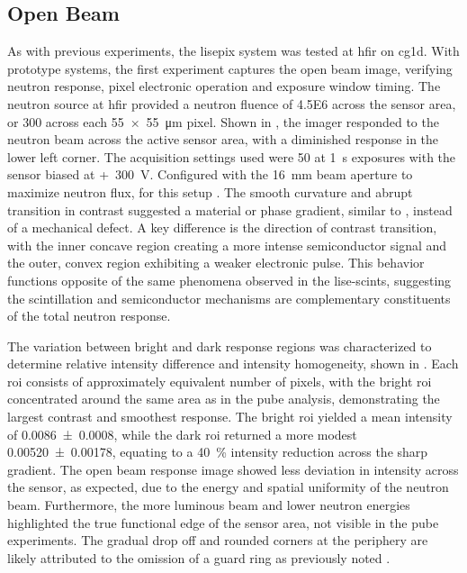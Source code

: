\documentclass[../../../main.tex]{subfiles}%
\begin{document}
%
    \subsection{Open Beam}%
    \label{sec:chapter-4:semiconductor-timepix:open-beam}%
    As with previous experiments, the \gls{lisepix} system was tested at \gls{hfir} on \gls{cg1d}. 
    With prototype systems, the first experiment captures the open beam image, verifying neutron response, pixel electronic operation and exposure window timing.    
    The neutron source at \gls{hfir} provided a neutron fluence of \SI{4.5E6}{\neutronfluence} across the sensor area, or \SI{300}{\neutronrate} across each \SI{55 x 55}{\micro\meter} pixel.    
    Shown in , the imager responded to the neutron beam across the active sensor area, with a diminished response in the lower left corner.
    The acquisition settings used were \SI{50}{\frames} at \SI{1}{\second} exposures with the sensor biased at \SI{300}[+]{\volt}.
    Configured with the \SI{16}{\milli\meter} beam aperture to maximize neutron flux,  for this setup \cite{Herrera_2018}.
    The smooth curvature and abrupt transition in contrast suggested a material or phase gradient, similar to , instead of a mechanical defect.
    A key difference is the direction of contrast transition, with the inner concave region creating a more intense semiconductor signal and the outer, convex region exhibiting a weaker electronic pulse.
    This behavior functions opposite of the same phenomena observed in the \glspl{lise-scint}, suggesting the scintillation and semiconductor mechanisms are complementary constituents of the total neutron response.
    \par%
    The variation between bright and dark response regions was characterized to determine relative intensity difference and intensity homogeneity, shown in .
    Each \gls{roi} consists of approximately equivalent number of pixels, with the bright \gls{roi} concentrated around the same area as in the \gls{pube} analysis, demonstrating the largest contrast and smoothest response.
    The bright \gls{roi} yielded a mean intensity of \num{0.0086(8)}, while the dark \gls{roi} returned a more modest \num{0.00520(178)}, equating to a \SI{40}{\percent} intensity reduction across the sharp gradient.
    The open beam response image showed less deviation in intensity across the sensor, as expected, due to the energy and spatial uniformity of the neutron beam.
    Furthermore, the more luminous beam and lower neutron energies highlighted the true functional edge of the sensor area, not visible in the \gls{pube} experiments.
    The gradual drop off and rounded corners at the periphery are likely attributed to the omission of a guard ring as previously noted \cite{Herrera_2018}.
\end{document}
